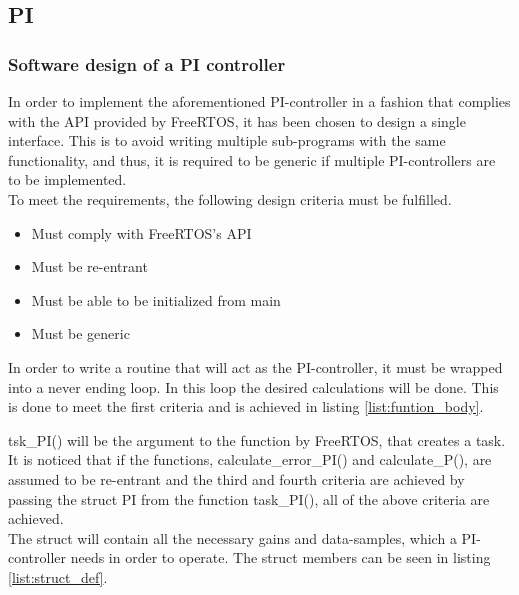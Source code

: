 \documentclass[../../../main]{subfiles}
\begin{document}
\subsection{PI}

\subsubsection{Software design of a PI controller}
In order to implement the aforementioned PI-controller in a fashion that complies with the API provided by FreeRTOS, it has been chosen to design a single interface.
This is to avoid writing multiple sub-programs with the same functionality, and thus, it is required to be generic if multiple PI-controllers are to be implemented.
\\

To meet the requirements, the following design criteria must be fulfilled.

\begin{itemize}
  \item Must comply with FreeRTOS's API
  \item Must be re-entrant
  \item Must be able to be initialized from main
  \item Must be generic
\end{itemize}

In order to write a routine that will act as the PI-controller, it must be wrapped into a never ending loop.
In this loop the desired calculations will be done. This is done to meet the first criteria and is achieved in listing \ref{list:funtion_body}.





tsk\_PI() will be the argument to the function by FreeRTOS, that creates a task.
It is noticed that if the functions, calculate\_error\_PI() and calculate\_P(), are assumed to be re-entrant and the third and fourth criteria are achieved by passing the struct PI from the function task\_PI(), all of the above criteria are achieved.
\\

The struct will contain all the necessary gains and data-samples, which a PI-controller needs in order to operate.
The struct members can be seen in listing \ref{list:struct_def}.

\end{document}
